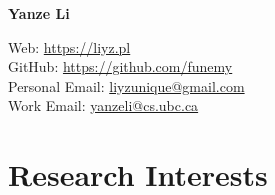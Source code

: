 \documentclass[12pt,letterpaper]{report}
\newcommand{\myname}{Yanze Li}
\newcommand{\namefont}[1]{{\normalfont\bfseries\Huge{#1}}}
\begin{document}
\raggedright

\namefont{\myname}

\vspace{1em}
\begin{minipage}[c]{0.7\textwidth}
	Web: \href{https://liyz.pl}{https://liyz.pl} \\
	GitHub: \href{https://github.com/funemy}{https://github.com/funemy}\\
	Personal Email: \href{mailto:liyzunique@gmail.com}{liyzunique@gmail.com} \\
	Work Email: \href{mailto:yanzeli@cs.ubc.ca}{yanzeli@cs.ubc.ca}
\end{minipage}
\vspace{-0.5em}


\section*{Research Interests}
\end{document}
